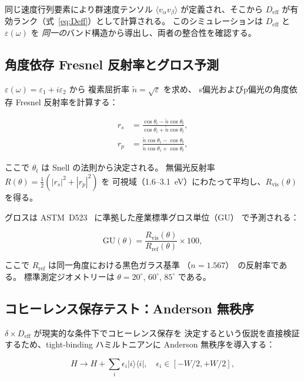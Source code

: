 \documentclass[twocolumn,showpacs,preprintnumbers,amsmath,amssymb,prb]{revtex4-2}
\begin{document}
同じ速度行列要素により群速度テンソル
$\langle v_\alpha v_\beta \rangle$ が定義され、そこから $D_\mathrm{eff}$
が有効ランク（式~\ref{eq:Deff}）として計算される。
このシミュレーションは $D_\mathrm{eff}$ と $\varepsilon(\omega)$ を
\emph{同一の}バンド構造から導出し、両者の整合性を確認する。

\subsection{角度依存 Fresnel 反射率とグロス予測}

$\varepsilon(\omega) = \varepsilon_1 + i\varepsilon_2$ から
複素屈折率 $\tilde{n} = \sqrt{\varepsilon}$ を求め、
s偏光およびp偏光の角度依存 Fresnel 反射率を計算する：

\begin{align}
  r_s &= \frac{\cos\theta_i - \tilde{n}\cos\theta_t}
              {\cos\theta_i + \tilde{n}\cos\theta_t}, \label{eq:rs} \\
  r_p &= \frac{\tilde{n}\cos\theta_i - \cos\theta_t}
              {\tilde{n}\cos\theta_i + \cos\theta_t}, \label{eq:rp}
\end{align}

\noindent ここで $\theta_t$ は Snell の法則から決定される。
無偏光反射率 $R(\theta) = \frac{1}{2}(|r_s|^2 + |r_p|^2)$ を
可視域（1.6--3.1~eV）にわたって平均し、$R_\mathrm{vis}(\theta)$ を得る。

グロスは ASTM~D523~\cite{ASTM_D523} に準拠した産業標準グロス単位（GU）
で予測される：

\begin{equation}
  \mathrm{GU}(\theta) = \frac{R_\mathrm{vis}(\theta)}
    {R_\mathrm{ref}(\theta)} \times 100,
  \label{eq:GU}
\end{equation}

\noindent ここで $R_\mathrm{ref}$ は同一角度における黒色ガラス基準
（$n = 1.567$）~\cite{ASTM_D523}の反射率である。
標準測定ジオメトリーは $\theta = 20^\circ$, $60^\circ$, $85^\circ$ である。

\subsection{コヒーレンス保存テスト：Anderson 無秩序}

$\delta \times D_\mathrm{eff}$ が現実的な条件下でコヒーレンス保存を
決定するという仮説を直接検証するため、tight-binding ハミルトニアンに
Anderson 無秩序を導入する：

\begin{equation}
  H \to H + \sum_i \epsilon_i |i\rangle\langle i|,
  \quad \epsilon_i \in [-W/2, +W/2],
  \label{eq:anderson}
\end{equation}
\end{document}
